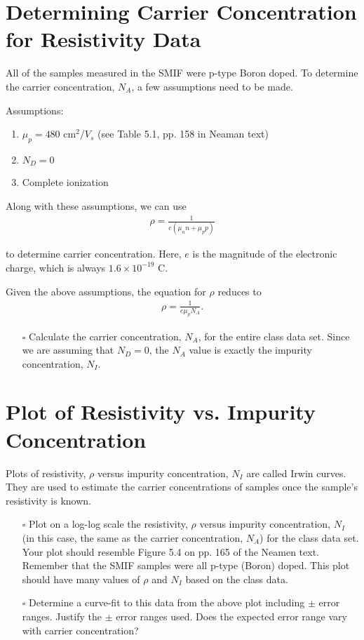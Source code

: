 \documentclass[12pt]{../manual}
\begin{document}
\newpage
\section{Determining Carrier Concentration for Resistivity Data}

All of the samples measured in the SMIF were p-type Boron doped.  To determine the carrier concentration, $N_A$, a few assumptions need to be made.  

Assumptions:
\begin{enumerate}
\item $\mu_p = 480 \mbox{ cm}^2/V_s$ (see Table 5.1, pp. 158 in Neaman text)
\item $N_D=0$
\item Complete ionization 
\end{enumerate}

Along with these assumptions, we can use
\begin{align}
\rho = \frac{1}{e(\mu_nn + \mu_pp)}
\end{align}

to determine carrier concentration. Here, $e$ is the magnitude of the electronic charge, which is always $1.6 \times 10^{-19}$ C.

Given the above assumptions, the equation for $\rho$ reduces to
\begin{align}
\rho = \frac{1}{e \mu_p N_A}.
\end{align}

\begin{itemize}
\item[$\square$] Calculate the carrier concentration, $N_A$, for the entire class data set. Since we are assuming that $N_D = 0$, the $N_A$ value is exactly the impurity concentration, $N_I$. 
\end{itemize}

\section{Plot of Resistivity vs. Impurity Concentration}

Plots of resistivity, $\rho$ versus impurity concentration, $N_I$ are called Irwin curves.  They are used to estimate the carrier concentrations of samples once the sample's resistivity is known.

\begin{itemize}
\item[$\square$] Plot on a log-log scale the resistivity, $\rho$ versus impurity concentration, $N_I$ (in this case, the same as the carrier concentration, $N_A$) for the class data set.  Your plot should resemble Figure 5.4 on pp. 165 of the Neamen text.  Remember that the SMIF samples were all p-type (Boron) doped.  This plot should have many values of $\rho$ and $N_I$ based on the class data.
\item[$\square$] Determine a curve-fit to this data from the above plot including $\pm$ error ranges.  Justify the $\pm$ error ranges used.  Does the expected error range vary with carrier concentration?
\end{itemize}
\end{document}
